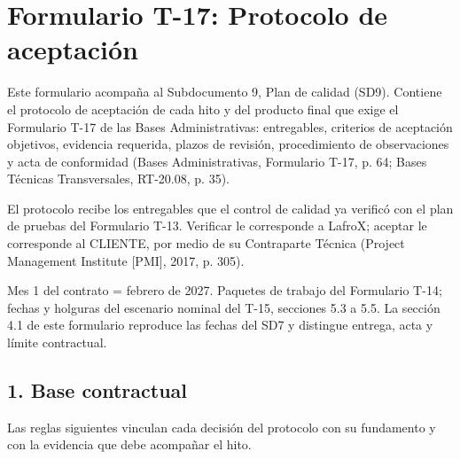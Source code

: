 \chapter*{Formulario T-17: Protocolo de aceptación}
\label{cap:t17}

Este formulario acompaña al Subdocumento 9, Plan de calidad (SD9). Contiene el protocolo de aceptación de cada hito y del producto final que exige el Formulario T-17 de las Bases Administrativas: entregables, criterios de aceptación objetivos, evidencia requerida, plazos de revisión, procedimiento de observaciones y acta de conformidad (Bases Administrativas, Formulario T-17, p. 64; Bases Técnicas Transversales, RT-20.08, p. 35).

El protocolo recibe los entregables que el control de calidad ya verificó con el plan de pruebas del Formulario T-13. Verificar le corresponde a LafroX; aceptar le corresponde al CLIENTE, por medio de su Contraparte Técnica (Project Management Institute [PMI], 2017, p. 305).

Mes 1 del contrato = febrero de 2027. Paquetes de trabajo del Formulario T-14; fechas y holguras del escenario nominal del T-15, secciones 5.3 a 5.5. La sección 4.1 de este formulario reproduce las fechas del SD7 y distingue entrega, acta y límite contractual.

\section*{1. Base contractual}

Las reglas siguientes vinculan cada decisión del protocolo con su fundamento y con la evidencia que debe acompañar el hito.

